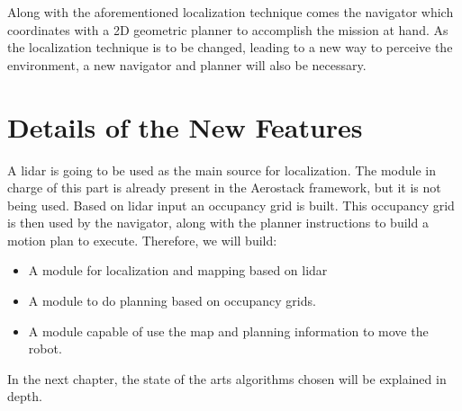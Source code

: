     Along with the aforementioned localization technique comes the navigator which coordinates with a 2D geometric planner to accomplish the mission at hand. As the localization technique is to be changed, leading to a new way to perceive the environment, a new navigator and planner will also be necessary. 

  \section{Details of the New Features} \label{ch_2:sect:improvements}

    A lidar is going to be used as the main source for localization. The module in charge of this part is already present in the Aerostack framework, but it is not being used. Based on lidar input an occupancy grid is built. This occupancy grid is then used by the navigator, along with the planner instructions to build a motion plan to execute. Therefore, we will build:
    
    \begin{itemize}
      \item A module for localization and mapping based on lidar
      \item A module to do planning based on occupancy grids.
      \item A module capable of use the map and planning information to move the robot.
    \end{itemize}

    In the next chapter, the state of the arts algorithms chosen will be explained in depth.

